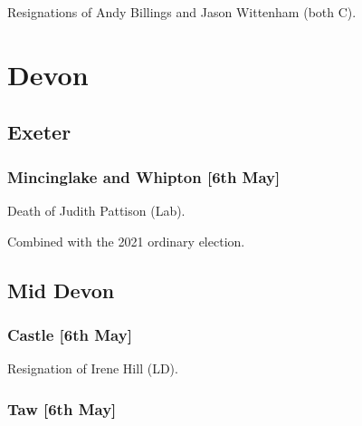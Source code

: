 \documentclass[a4paper,openany]{book}
\begin{document}
\begin{resultsiii}

Resignations of Andy Billings and Jason Wittenham (both C).

\section{Devon}

\subsection*{Exeter}

\subsubsection*{Mincinglake and Whipton \hspace*{\fill}\nolinebreak[1]%
	\enspace\hspace*{\fill}
	[6th May]}


Death of Judith Pattison (Lab).

Combined with the 2021 ordinary election.

\subsection*{Mid Devon}

\subsubsection*{Castle \hspace*{\fill}\nolinebreak[1]%
	\enspace\hspace*{\fill}
	[6th May]}


Resignation of Irene Hill (LD).

\subsubsection*{Taw \hspace*{\fill}\nolinebreak[1]%
	\enspace\hspace*{\fill}
	[6th May]}



\end{resultsiii}
\end{document}
